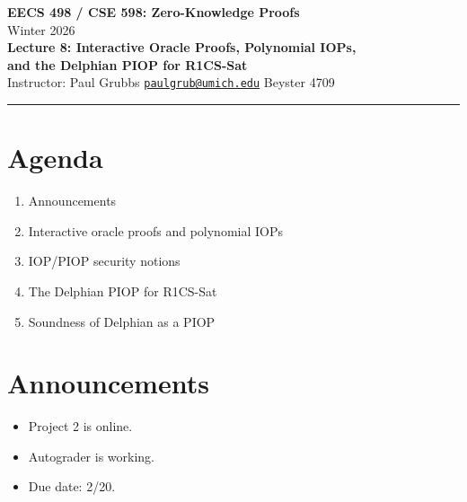 \documentclass[11pt]{article}
\theoremstyle{plain}
\theoremstyle{definition}
\begin{document}
\begin{center}
  {\LARGE \textbf{EECS 498 / CSE 598: Zero-Knowledge Proofs}}\\[6pt]
  {\large Winter 2026}\\[4pt]
  {\large \textbf{Lecture 8: Interactive Oracle Proofs, Polynomial IOPs,}}\\
  {\large \textbf{and the Delphian PIOP for R1CS-Sat}}\\[6pt]
  Instructor: Paul Grubbs \quad
  \href{mailto:paulgrub@umich.edu}{\texttt{paulgrub@umich.edu}} \quad
  Beyster 4709
\end{center}

\hrule
\vspace{10pt}

\section*{Agenda}
\begin{enumerate}[leftmargin=2em]
  \item Announcements
  \item Interactive oracle proofs and polynomial IOPs
  \item IOP/PIOP security notions
  \item The Delphian PIOP for R1CS-Sat
  \item Soundness of Delphian as a PIOP
\end{enumerate}

\newpage

\section{Announcements}

\begin{itemize}
  \item Project 2 is online.
  \item Autograder is working.
  \item Due date: 2/20.
\end{itemize}

\end{document}
